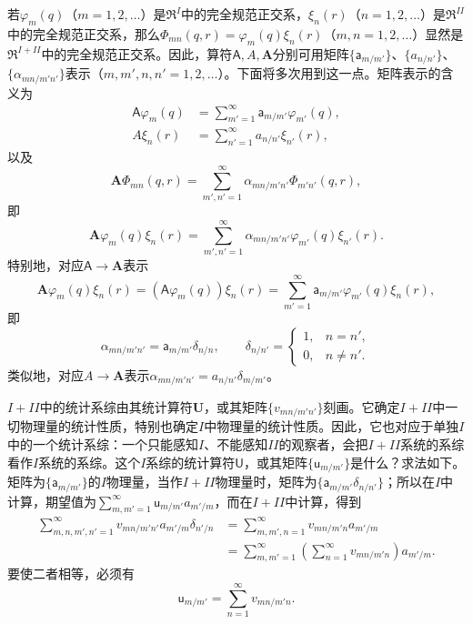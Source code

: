 \documentclass[fontsize=13pt,twoside,openany,headings=normal,parskip=false,bookmarkpackage=false,DIV=calc]{scrbook}
\begin{document}
若$\varphi_m(q)$（$m=1,\allowbreak 2,\allowbreak \ldots$）是$\mathfrak R^I$中的完全规范正交系，$\xi_n(r)$（$n=1,\allowbreak 2,\allowbreak \ldots$）是$\mathfrak R^{II}$中的完全规范正交系，那么$\Phi_{mn}(q,\allowbreak r)=\varphi_m(q)\xi_n(r)$（$m,\allowbreak n=1,\allowbreak 2,\allowbreak \ldots$）显然是$\mathfrak R^{I+II}$中的完全规范正交系。因此，算符$\mathsf A,\allowbreak A,\allowbreak \boldsymbol A$分别可用矩阵$\{\mathsf a_{m/m'}\}$、$\{a_{n/n'}\}$、$\{\alpha_{mn/m'n'}\}$表示（$m,\allowbreak m',\allowbreak n,\allowbreak n'=1,\allowbreak 2,\allowbreak \ldots$）。下面将多次用到这一点。矩阵表示的含义为
\begin{align*}
 \mathsf A\varphi_m(q)&=\sum_{m'=1}^{\infty}\mathsf a_{m/m'}\varphi_{m'}(q),\\
 A\xi_n(r)&=\sum_{n'=1}^{\infty}a_{n/n'}\xi_{n'}(r),
\end{align*}\hypertarget{origpage-226}{}\label{origpage-226}以及
\[
 \boldsymbol A\Phi_{mn}(q,r)
 =\sum_{m',n'=1}^{\infty}\alpha_{mn/m'n'}\Phi_{m'n'}(q,r),
\]
即
\[
 \boldsymbol A\varphi_m(q)\xi_n(r)
 =\sum_{m',n'=1}^{\infty}\alpha_{mn/m'n'}\varphi_{m'}(q)\xi_{n'}(r).
\]
特别地，对应$\mathsf A\longrightarrow\boldsymbol A$表示
\[
 \boldsymbol A\varphi_m(q)\xi_n(r)
 =(\mathsf A\varphi_m(q))\xi_n(r)
 =\sum_{m'=1}^{\infty}\mathsf a_{m/m'}\varphi_{m'}(q)\xi_n(r),
\]
即
\[
 \alpha_{mn/m'n'}=\mathsf a_{m/m'}\delta_{n/n},\qquad
 \delta_{n/n'}=\begin{cases}1,&n=n',\\0,&n\ne n'.\end{cases}
\]
类似地，对应$A\longrightarrow\boldsymbol A$表示$\alpha_{mn/m'n'}=a_{n/n'}\delta_{m/m'}$。

$I+II$中的统计系综由其统计算符$\boldsymbol U$，或其矩阵$\{v_{mn/m'n'}\}$刻画。它确定$I+II$中一切物理量的统计性质，特别也确定$I$中物理量的统计性质。因此，它也对应于单独$I$中的一个统计系综：一个只能感知$I$、不能感知$II$的观察者，会把$I+II$系统的系综看作$I$系统的系综。这个$I$系综的统计算符$\mathsf U$，或其矩阵$\{\mathsf u_{m/m'}\}$是什么？求法如下。矩阵为$\{\mathsf a_{m/m'}\}$的$I$物理量，当作$I+II$物理量时，矩阵为$\{\mathsf a_{m/m'}\delta_{n/n'}\}$；所以在$I$中计算，期望值为$\sum_{m,\allowbreak m'=1}^{\infty}\mathsf u_{m/m'}a_{m'/m}$，而在$I+II$中计算，得到
\begin{align*}
 \sum_{m,n,m',n'=1}^{\infty}v_{mn/m'n'}a_{m'/m}\delta_{n'/n}
 &=\sum_{m,m',n=1}^{\infty}v_{mn/m'n}a_{m'/m}\\
 &=\sum_{m,m'=1}^{\infty}\left(\sum_{n=1}^{\infty}v_{mn/m'n}\right)a_{m'/m}.
\end{align*}
要使二者相等，必须有
\[
 \mathsf u_{m/m'}=\sum_{n=1}^{\infty}v_{mn/m'n}.
\]
\end{document}
